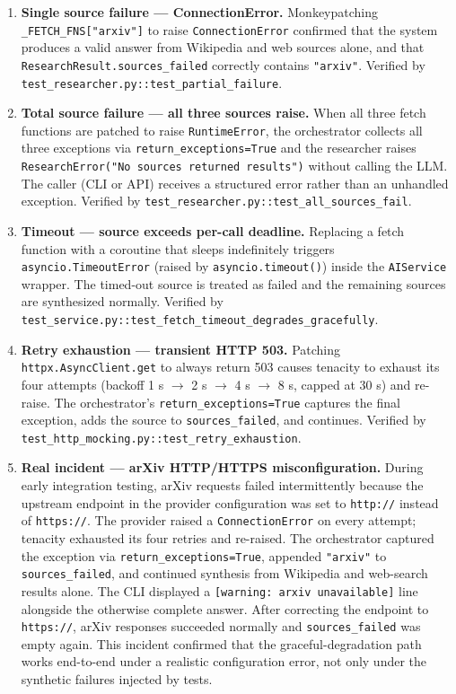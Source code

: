 \documentclass[12pt,a4paper]{article}
\begin{document}
\begin{enumerate}
  \item \textbf{Single source failure — ConnectionError.}
    Monkeypatching \texttt{\_FETCH\_FNS["arxiv"]} to raise \texttt{ConnectionError}
    confirmed that the system produces a valid answer from Wikipedia and web sources alone,
    and that \texttt{ResearchResult.sources\_failed} correctly contains \texttt{"arxiv"}.
    Verified by \texttt{test\_researcher.py::test\_partial\_failure}.

  \item \textbf{Total source failure — all three sources raise.}
    When all three fetch functions are patched to raise \texttt{RuntimeError}, the
    orchestrator collects all three exceptions via \texttt{return\_exceptions=True} and the
    researcher raises \texttt{ResearchError("No sources returned results")} without calling
    the LLM.  The caller (CLI or API) receives a structured error rather than an unhandled
    exception.  Verified by \texttt{test\_researcher.py::test\_all\_sources\_fail}.

  \item \textbf{Timeout — source exceeds per-call deadline.}
    Replacing a fetch function with a coroutine that sleeps indefinitely triggers
    \texttt{asyncio.TimeoutError} (raised by \texttt{asyncio.timeout()}) inside the
    \texttt{AIService} wrapper.  The timed-out source is treated as failed and the remaining
    sources are synthesized normally.  Verified by
    \texttt{test\_service.py::test\_fetch\_timeout\_degrades\_gracefully}.

  \item \textbf{Retry exhaustion — transient HTTP 503.}
    Patching \texttt{httpx.AsyncClient.get} to always return 503 causes tenacity to exhaust
    its four attempts (backoff 1 s $\to$ 2 s $\to$ 4 s $\to$ 8 s, capped at 30 s) and
    re-raise.  The orchestrator's \texttt{return\_exceptions=True} captures the final
    exception, adds the source to \texttt{sources\_failed}, and continues.
    Verified by \texttt{test\_http\_mocking.py::test\_retry\_exhaustion}.

  \item \textbf{Real incident — arXiv HTTP/HTTPS misconfiguration.}
    During early integration testing, arXiv requests failed intermittently because the
    upstream endpoint in the provider configuration was set to \texttt{http://} instead of
    \texttt{https://}.  The provider raised a \texttt{ConnectionError} on every attempt;
    tenacity exhausted its four retries and re-raised.  The orchestrator captured the
    exception via \texttt{return\_exceptions=True}, appended \texttt{"arxiv"} to
    \texttt{sources\_failed}, and continued synthesis from Wikipedia and web-search results
    alone.  The CLI displayed a \texttt{[warning: arxiv unavailable]} line alongside the
    otherwise complete answer.  After correcting the endpoint to \texttt{https://},
    arXiv responses succeeded normally and \texttt{sources\_failed} was empty again.
    This incident confirmed that the graceful-degradation path works end-to-end under a
    realistic configuration error, not only under the synthetic failures injected by tests.
\end{enumerate}
\end{document}
